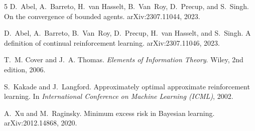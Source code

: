 \documentclass[11pt]{article}
\theoremstyle{definition}
\begin{document}
\begin{thebibliography}{5}
D.~Abel, A.~Barreto, H.~van Hasselt, B.~Van~Roy, D.~Precup, and S.~Singh.
\newblock On the convergence of bounded agents.
\newblock arXiv:2307.11044, 2023.

D.~Abel, A.~Barreto, B.~Van~Roy, D.~Precup, H.~van Hasselt, and S.~Singh.
\newblock A definition of continual reinforcement learning.
\newblock arXiv:2307.11046, 2023.

T.~M. Cover and J.~A. Thomas.
\newblock \emph{Elements of Information Theory}.
\newblock Wiley, 2nd edition, 2006.

S.~Kakade and J.~Langford.
\newblock Approximately optimal approximate reinforcement learning.
\newblock In \emph{International Conference on Machine Learning (ICML)}, 2002.

A.~Xu and M.~Raginsky.
\newblock Minimum excess risk in Bayesian learning.
\newblock arXiv:2012.14868, 2020.
\end{thebibliography}
\end{document}
